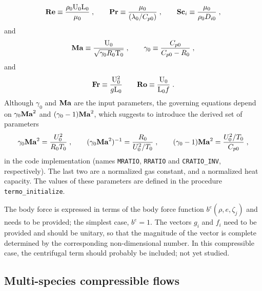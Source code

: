 \begin{equation}
  \mathrm{\bf Re} \equiv \frac{\rho_0 \mathrm{U}_0 \mathrm{L}_0}{\mu_0}\;, \qquad
  \mathrm{\bf Pr} \equiv \frac{\mu_0}{(\lambda_0/C_{p0})}\;, \qquad
  \mathrm{\bf Sc}_i \equiv \frac{\mu_0}{\rho_0 D_{i0}}\;,
\end{equation}
and
\begin{equation}
  \mathrm{\bf Ma}  \equiv \frac{\mathrm{U}_0}{\sqrt{\gamma_0 R_0 \mathrm{T}_0}}\;, \qquad
  \gamma_0 \equiv \frac{C_{p0}}{C_{p0}-R_0}\;,
\end{equation}
and
\begin{equation}
  \mathrm{\bf Fr} \equiv \frac{\mathrm{U}_0^2}{g\mathrm{L}_0} \qquad \mathrm{\bf Ro} \equiv \frac{\mathrm{U}_0}{\mathrm{L}_0f} \;.
\end{equation}
Although $\gamma_0$ and $\mathrm{\bf Ma}$ are the input parameters, the governing equations depend on $\gamma_0\mathrm{\bf Ma}^2$ and $(\gamma_0-1)\mathrm{\bf Ma}^2$, which suggests to introduce the derived set of parameters
\begin{equation}
    \gamma_0\mathrm{\bf Ma}^2=\frac{U_0^2}{R_0T_0}\;,\qquad (\gamma_0\mathrm{\bf Ma}^2)^{-1}=\frac{R_0}{U^2_0/T_0}\;,\qquad (\gamma_0-1)\mathrm{\bf Ma}^2 =\frac{U_0^2/T_0}{C_{p0}} \;,
\end{equation}
in the code implementation (names \texttt{MRATIO}, \texttt{RRATIO} and \texttt{CRATIO\_INV}, respectively). The last two are a normalized gas constant, and a normalized heat capacity. The values of these parameters are defined in the procedure \texttt{termo\_initialize}.

The body force is expressed in terms of the body force function $b^e(\rho,e,\zeta_j)$ and needs to be provided; the simplest case, $b^e=1$. The vectors $g_i$ and $f_i$ need to be provided and should be unitary, so that the magnitude of the vector is complete determined by the corresponding non-dimensional number. In this compressible case, the centrifugal term should probably be included; not yet studied.

\subsection{Multi-species compressible flows}

